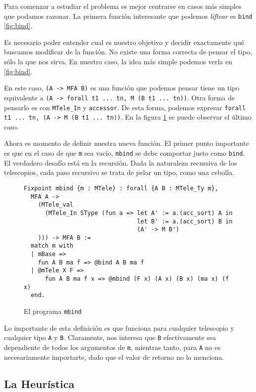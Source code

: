 Para comenzar a estudiar el problema es mejor centrarse en casos más simples que
podamos razonar. La primera función interesante que podemos \textit{liftear} es
\lstinline{bind} \ref{fig:bind}. 

Es necesario poder entender cual es nuestro objetivo y decidir exactamente qué
buscamos modificar de la función. No existe una forma correcta de pensar el
tipo, sólo la que nos sirva. En nuestro caso, la idea más simple podemos verla
en \ref{fig:bind}.

En este caso, \lstinline{(A -> MFA B)} es una función que podemos pensar tiene un
tipo equivalente a \lstinline{(A -> forall t1 ... tn, M (B t1 ... tn))}. Otra forma
de pensarlo es con \lstinline{MTele_In} y \lstinline{accessor}. De esta forma, podemos
expresar \lstinline{forall t1 ... tn, (A -> M (B t1 ... tn))}. En la figura
\ref{fig:mbind} se puede observar el último caso. 

Ahora es momento de definir nuestra nueva función. El primer punto importante es
que en el caso de que \lstinline{m} sea vacío, \lstinline{mbind} se debe comportar justo
como \lstinline{bind}. El verdadero desafío está en la recursión. Dada la naturaleza
recursiva de los telescopios, cada paso recursivo se trata de pelar un tipo,
como una cebolla.

\begin{figure}[h]
\centering
\begin{lstlisting}
Fixpoint mbind {m : MTele} : forall {A B : MTele_Ty m},
  MFA A ->
    (MTele_val
      (MTele_In SType (fun a => let A' := a.(acc_sort) A in
                                let B' := a.(acc_sort) B in
                                (A' -> M B')
    ))) -> MFA B :=
  match m with
  | mBase =>
    fun A B ma f => @bind A B ma f
  | @mTele X F =>
      fun A B ma f x => @mbind (F x) (A x) (B x) (ma x) (f x)
  end.
\end{lstlisting}
\caption{El programa \lstinline{mbind}}
\label{fig:mbind}
\end{figure}

Lo importante de esta definición es que funciona para cualquier telescopio y
cualquier tipo \lstinline{A} y \lstinline{B}. Claramente, nos interesa que \lstinline{B}
efectivamente sea dependiente de todos los argumentos de \lstinline{m}, mientras
tanto, para \lstinline{A} no es necesariamente importarte, dado que el valor de
retorno no lo menciona.

\subsection{La Heurística}

